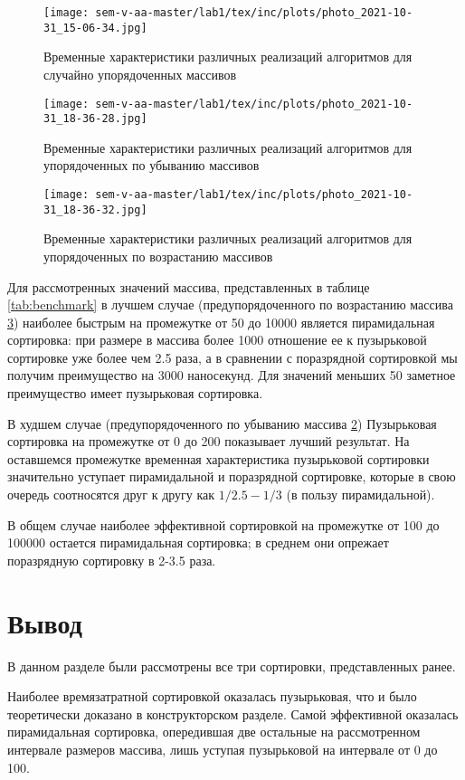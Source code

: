 \begin{figure}
    \centering
\texttt{[image: sem-v-aa-master/lab1/tex/inc/plots/photo\_2021-10-31\_15-06-34.jpg]}

    \caption{Временные характеристики различных реализаций алгоритмов для случайно упорядоченных массивов}
    \label{fig:timestamps}
\end{figure}

\begin{figure}
    \centering
\texttt{[image: sem-v-aa-master/lab1/tex/inc/plots/photo\_2021-10-31\_18-36-28.jpg]}

    \caption{Временные характеристики различных реализаций алгоритмов для упорядоченных по убыванию массивов}
    \label{fig:timestamps_descending}
\end{figure}

\begin{figure}
    \centering
\texttt{[image: sem-v-aa-master/lab1/tex/inc/plots/photo\_2021-10-31\_18-36-32.jpg]}

    \caption{Временные характеристики различных реализаций алгоритмов для упорядоченных по возрастанию массивов}
    \label{fig:timestamps_ascending}
\end{figure}

Для рассмотренных значений массива, представленных в таблице \ref{tab:benchmark} в лучшем случае (предупорядоченного по возрастанию массива \ref{fig:timestamps_ascending}) наиболее быстрым на промежутке от 50 до 10000 является пирамидальная сортировка: при размере в массива более 1000 отношение ее к пузырьковой сортировке уже более чем 2.5 раза, а в сравнении с поразрядной сортировкой мы получим преимущество на 3000 наносекунд. Для значений меньших 50 заметное преимущество имеет пузырьковая сортировка. 

В худшем случае (предупорядоченного по убыванию массива \ref{fig:timestamps_descending}) Пузырьковая сортировка на промежутке от 0 до 200 показывает лучший результат. На оставшемся промежутке временная характеристика пузырьковой сортировки значительно уступает пирамидальной и поразрядной сортировке, которые в свою очередь соотносятся друг к другу как $1/2.5 - 1/3$ (в пользу пирамидальной).

В общем случае наиболее эффективной сортировкой на промежутке от 100  до 100000 остается пирамидальная сортировка; в среднем они опрежает поразрядную сортировку в 2-3.5 раза.

\section{Вывод}
В данном разделе были рассмотрены все три сортировки, представленных ранее.

Наиболее времязатратной сортировкой оказалась пузырьковая, что и было теоретически доказано в конструкторском разделе. Самой эффективной оказалась пирамидальная сортировка, опередившая две остальные на рассмотренном интервале размеров массива, лишь уступая пузырьковой на интервале от 0 до 100.
